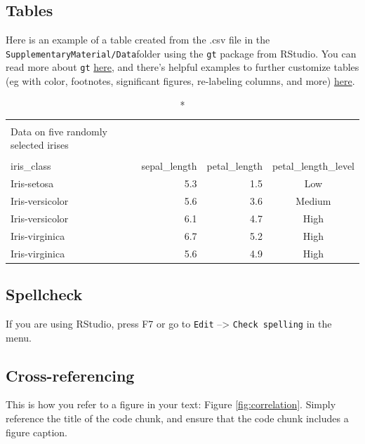 \documentclass[]{elsarticle} %
\begin{document}
\hypertarget{tables}{%
\subsection{Tables}\label{tables}}

Here is an example of a table created from the .csv file in the \texttt{SupplementaryMaterial/Data}folder using the \texttt{gt} package from RStudio. You can read more about \texttt{gt} \href{https://github.com/rstudio/gt}{here}, and there's helpful examples to further customize tables (eg with color, footnotes, significant figures, re-labeling columns, and more) \href{https://github.com/allisonhorst/gt-awesome-tables}{here}.

\captionsetup[table]{labelformat=empty,skip=1pt}
\begin{longtable}{lrrc}
\caption*{
\large Example irises\\ 
\small Data on five randomly selected irises\\ 
} \\ 
\toprule
iris\_class & sepal\_length & petal\_length & petal\_length\_level \\ 
\midrule
Iris-setosa & 5.3 & 1.5 & Low \\ 
Iris-versicolor & 5.6 & 3.6 & Medium \\ 
Iris-versicolor & 6.1 & 4.7 & High \\ 
Iris-virginica & 6.7 & 5.2 & High \\ 
Iris-virginica & 5.6 & 4.9 & High \\ 
\bottomrule
\end{longtable}

\hypertarget{spellcheck}{%
\subsection{Spellcheck}\label{spellcheck}}

If you are using RStudio, press F7 or go to \texttt{Edit} --\textgreater{} \texttt{Check\ spelling} in the menu.

\hypertarget{cross-referencing}{%
\subsection{Cross-referencing}\label{cross-referencing}}

This is how you refer to a figure in your text: Figure \ref{fig:correlation}. Simply reference the title of the code chunk, and ensure that the code chunk includes a figure caption.
\end{document}
